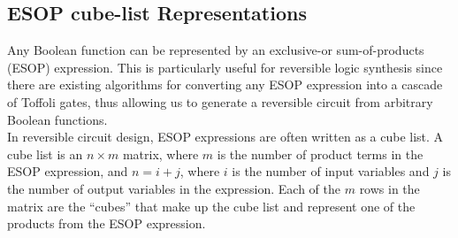 \subsection{ESOP cube-list Representations}

Any Boolean function can be represented by an exclusive-or sum-of-products (ESOP) expression. This is particularly useful for reversible logic synthesis since there are existing algorithms for converting any ESOP expression into a cascade of Toffoli gates, thus allowing us to generate a reversible circuit from arbitrary Boolean functions. \\ 


In reversible circuit design, ESOP expressions are often written as a cube list. A cube list is an $ n \times m $ matrix, where $m$ is the number of product terms in the ESOP expression, and $n = i + j$, where $i$ is the number of input variables and $j$ is the number of output variables in the expression. Each of the $m$ rows in the matrix are the ``cubes'' that make up the cube list and represent one of the products from the ESOP expression. \\

